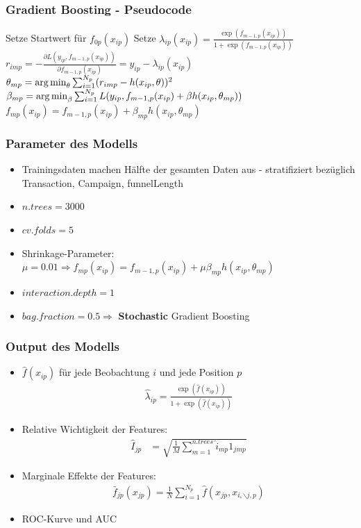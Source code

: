 \begin{frame}\frametitle{Gradient Boosting - Pseudocode}
		\begin{algorithmic}
		\STATE Setze Startwert für $f_{0p}(x_{ip})$
			\STATE Setze $\lambda_{ip}(x_{ip}) = \frac{\exp(f_{m-1,p}(x_{ip}))}{1+\exp(f_{m-1,p}(x_{ip}))}$
				\STATE $r_{imp} = - \frac{\partial L(y_{ip},f_{m-1,p}(x_{ip}))}{\partial f_{m-1,p}(x_{ip})} = y_{ip} - \lambda_{ip}(x_{ip})$
			\ENDFOR
			\STATE $\theta_{mp} = \operatorname*{arg\,min}_{\theta} \sum_{i=1}^{N_p} (r_{imp} - h(x_{ip}, \theta))^2$
			\STATE $\beta_{mp} = \operatorname*{arg\,min}_{\beta} \sum_{i=1}^{N_p} L(y_{ip}, f_{m-1,p}(x_{ip}) + \beta h(x_{ip},\theta_{mp}))$
			\STATE $f_{mp}(x_{ip}) = f_{m-1,p}(x_{ip}) + \beta_{mp} h(x_{ip},\theta_{mp})$
		\ENDFOR
		\end{algorithmic}
\end{frame}

\begin{frame}\frametitle{Parameter des Modells}
	\begin{itemize}
		\item Trainingsdaten machen Hälfte der gesamten Daten aus - stratifiziert bezüglich Transaction, Campaign, funnelLength
		\item $n.trees=3000$
		\item $cv.folds=5$
		\item Shrinkage-Parameter: $\mu = 0.01 \Rightarrow f_{mp}(x_{ip}) = f_{m-1,p}(x_{ip}) + \mu \beta_{mp} h(x_{ip},\theta_{mp})$
		\item $interaction.depth=1$
		\item $bag.fraction=0.5 \Rightarrow$ \textbf{Stochastic} Gradient Boosting
	\end{itemize}
\end{frame}

\begin{frame}\frametitle{Output des Modells}
	\begin{itemize}
		\item $\hat{f}(x_{ip})$ für jede Beobachtung $i$ und jede Position $p$
			\begin{align*}
				\hat{\lambda}_{ip} = \frac{\exp(\hat{f}(x_{ip}))}{1+\exp(\hat{f}(x_{ip}))}
			\end{align*}
		\item Relative Wichtigkeit der Features:
			\begin{align*}
				\hat{I}_{jp} &= \sqrt{\frac{1}{M} \sum_{m=1}^{n.trees} \hat{i}_{mp} 1_{jmp}}
			\end{align*}
		\item Marginale Effekte der Features:
			\begin{align*}
				\bar{f}_{jp}(x_{jp}) = \frac{1}{N} \sum_{i=1}^{N_p} \hat{f}(x_{jp},x_{i,\backslash j,p})
			\end{align*}
		\item ROC-Kurve und AUC
	\end{itemize}
\end{frame}

